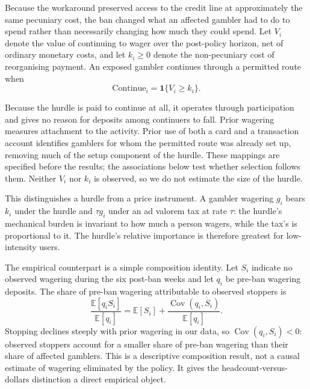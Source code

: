 \documentclass[12pt]{article}
\begin{document}
Because the workaround preserved access to the credit line at approximately the same pecuniary cost, the ban changed what an affected gambler had to do to spend rather than necessarily changing how much they could spend. Let $V_i$ denote the value of continuing to wager over the post-policy horizon, net of ordinary monetary costs, and let $k_i \geq 0$ denote the non-pecuniary cost of reorganising payment. An exposed gambler continues through a permitted route when
\begin{equation}\label{eq:continue}
    \mathrm{Continue}_i = \mathbf{1}\{V_i \geq k_i\}.
\end{equation}

Because the hurdle is paid to continue at all, it operates through participation and gives no reason for deposits among continuers to fall. Prior wagering measures attachment to the activity. Prior use of both a card and a transaction account identifies gamblers for whom the permitted route was already set up, removing much of the setup component of the hurdle. These mappings are specified before the results; the associations below test whether selection follows them. Neither $V_i$ nor $k_i$ is observed, so we do not estimate the size of the hurdle.

This distinguishes a hurdle from a price instrument. A gambler wagering $g_i$ bears $k_i$ under the hurdle and $\tau g_i$ under an ad valorem tax at rate $\tau$: the hurdle's mechanical burden is invariant to how much a person wagers, while the tax's is proportional to it. The hurdle's relative importance is therefore greatest for low-intensity users.

The empirical counterpart is a simple composition identity. Let $S_i$ indicate no observed wagering during the six post-ban weeks and let $q_i$ be pre-ban wagering deposits. The share of pre-ban wagering attributable to observed stoppers is
\begin{equation}\label{eq:composition}
    \frac{\mathbb{E}[q_iS_i]}{\mathbb{E}[q_i]}
    = \mathbb{E}[S_i] + \frac{\operatorname{Cov}(q_i,S_i)}{\mathbb{E}[q_i]}.
\end{equation}
Stopping declines steeply with prior wagering in our data, so $\operatorname{Cov}(q_i,S_i)<0$: observed stoppers account for a smaller share of pre-ban wagering than their share of affected gamblers. This is a descriptive composition result, not a causal estimate of wagering eliminated by the policy. It gives the headcount-versus-dollars distinction a direct empirical object.
\end{document}
